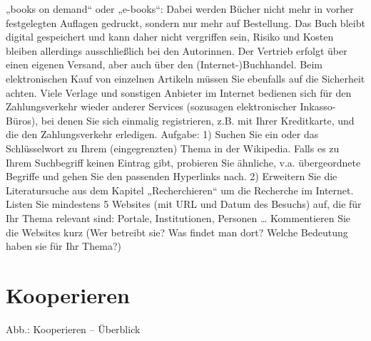 \documentclass[]{book}
\theoremstyle{definition}
\theoremstyle{definition}
\theoremstyle{definition}
\theoremstyle{remark}
\begin{document}
„books on demand`` oder „e-books``: Dabei werden Bücher nicht mehr in
vorher festgelegten Auflagen gedruckt, sondern nur mehr auf Bestellung.
Das Buch bleibt digital gespeichert und kann daher nicht vergriffen
sein, Risiko und Kosten bleiben allerdings ausschließlich bei den
Autorinnen. Der Vertrieb erfolgt über einen eigenen Versand, aber auch
über den (Internet-)Buchhandel. Beim elektronischen Kauf von einzelnen
Artikeln müssen Sie ebenfalls auf die Sicherheit achten. Viele Verlage
und sonstigen Anbieter im Internet bedienen sich für den Zahlungsverkehr
wieder anderer Services (sozusagen elektronischer Inkasso-Büros), bei
denen Sie sich einmalig registrieren, z.B. mit Ihrer Kreditkarte, und
die den Zahlungsverkehr erledigen. Aufgabe: 1) Suchen Sie ein oder das
Schlüsselwort zu Ihrem (eingegrenzten) Thema in der Wikipedia. Falls es
zu Ihrem Suchbegriff keinen Eintrag gibt, probieren Sie ähnliche, v.a.
übergeordnete Begriffe und gehen Sie den passenden Hyperlinks nach. 2)
Erweitern Sie die Literatursuche aus dem Kapitel „Recherchieren`` um die
Recherche im Internet. Listen Sie mindestens 5 Websites (mit URL und
Datum des Besuchs) auf, die für Ihr Thema relevant sind: Portale,
Institutionen, Personen \ldots{} Kommentieren Sie die Websites kurz (Wer
betreibt sie? Was findet man dort? Welche Bedeutung haben sie für Ihr
Thema?)

\chapter{Kooperieren}\label{kooperieren}

Abb.: Kooperieren -- Überblick
\end{document}
